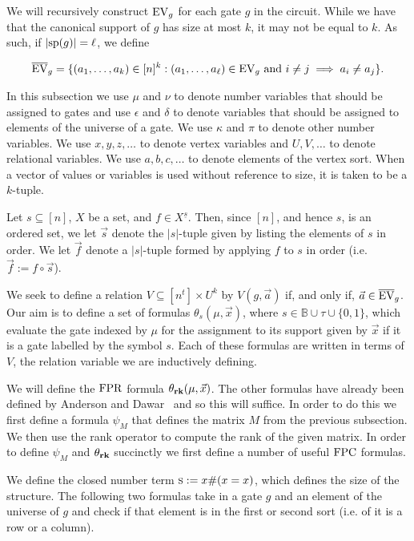 \documentclass[../paper.tex]{subfiles}
\begin{document}
We will recursively construct $\text{EV}_g$ for each gate $g$ in the circuit. While
we have that the canonical support of $g$ has size at most $k$, it may not be
equal to $k$. As such, if $\vert \text{sp}(g) \vert = \ell$, we define

\begin{align*}
	\overline{\text{EV}}_g = \{ (a_1, \ldots , a_k) \in [n]^k : (a_1 , \ldots , a_\ell ) \in \text{EV}_g \text{ and } i \neq j \implies a_i \neq a_j \}. 
\end{align*}

In this subsection we use $\mu$ and $\nu$ to denote number variables that should be assigned to gates and use $\epsilon$ and $\delta$ to denote variables that should be assigned to elements of the universe of a gate. We use $\kappa$ and $\pi$ to denote other number variables. We use $x, y, z, \ldots$ to denote vertex variables and $U, V, \ldots$ to denote relational variables. We use $a, b, c , \ldots$ to denote elements of the vertex sort. When a vector of values or variables is used without reference to size, it is taken to be a $k$-tuple. 

Let $s \subseteq [n]$, $X$ be a set, and $f \in X^{\underline{s}}$. Then, since $[n]$, and hence $s$, is an ordered set, we let $\vec{s}$ denote the $\vert s \vert$-tuple given by listing the elements of $s$ in order. We let $\vec{f}$ denote a $\vert s \vert$-tuple formed by applying $f$ to $s$ in order (i.e. $\vec{f} := f \circ \vec{s}$). 

We seek to define a relation $V \subseteq [n^t] \times U^k$ by $V(g, \vec{a})$
if, and only if, $\vec{a} \in \overline {\text{EV}}_g$. Our aim is to define a set of
formulas $\theta_s (\mu, \vec{x})$, where $s \in \mathbb{B} \cup \tau \cup
\{0,1\}$, which evaluate the gate indexed by $\mu$ for the assignment to its
support given by $\vec{x}$ if it is a gate labelled by the symbol $s$. Each of
these formulas are written in terms of $V$, the relation variable we are
inductively defining. 

We will define the $\text{\upshape FPR}$ formula $\theta_{\text{\textbf{rk}}} (\mu, \vec{x})$. The other
formulas have already been defined by Anderson and Dawar~\cite{AndersonD17} and
so this will suffice. In order to do this we first define a formula $\psi_M$
that defines the matrix $M$ from the previous subsection. We then use the rank
operator to compute the rank of the given matrix. In order to define $\psi_M$
and $\theta_{\text{\textbf{rk}}}$ succinctly we first define a number of useful $\text{\upshape FPC}$
formulas.

We define the closed number term $\textsc{s} := x\# (x = x)$, which defines the size
of the structure. The following two formulas take in a gate $g$ and an element
of the universe of $g$ and check if that element is in the first or second sort
(i.e. of it is a row or a column).
\end{document}
